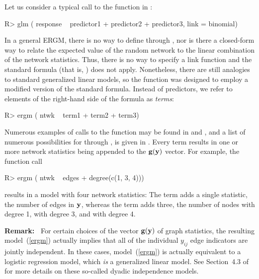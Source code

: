 \documentclass[nojss]{jss}
\def\vec#1{\mathchoice{\mbox{\boldmath$\displaystyle\bf#1$}}
{\mbox{\boldmath$\textstyle\bf#1$}}
{\mbox{\boldmath$\scriptstyle\bf#1$}}
{\mbox{\boldmath$\scriptscriptstyle\bf#1$}}}
\begin{document}
Let us consider a typical call to the  function in :
\begin{CodeChunk}
\begin{CodeInput}
R> glm ( response ~ predictor1 + predictor2 + predictor3, link = binomial)
\end{CodeInput}
\end{CodeChunk}
In a general ERGM, there
is no way to define  through ,
nor is there a closed-form way to relate the expected value of the random
network to the linear combination of the network statistics.  Thus, there is
no way to specify a link function and the standard  formula
(that is, ) does not apply.  Nonetheless, there
are still analogies to standard generalized linear models, so the
 function was designed to employ a modified version of the
standard  formula.  Instead of predictors, we refer to elements of
the right-hand side of the formula as {\em terms}:
\begin{CodeChunk}
\begin{CodeInput}
R> ergm ( ntwk ~ term1 + term2 + term3)
\end{CodeInput}
\end{CodeChunk}
Numerous examples of calls to the  function may be found in
\citet{ergmjss} and \citet{statnettutorialjss}, and a list of numerous possibilities
for  through , is given in \citet{ergmtermsjss}.
Every term results in one or more network statistics being appended to the 
$\vec g(\vec y)$ vector.  For example, the function call
\begin{CodeChunk}
\begin{CodeInput}
R> ergm ( ntwk ~ edges + degree(c(1, 3, 4)))
\end{CodeInput}
\end{CodeChunk}
results in a model with four network statistics:
The  term adds
a single statistic, the number of edges in $\vec y$, whereas the  term
adds three, the number of nodes with degree 1, with degree 3, and with degree 4.

{\bf Remark:\ }
For certain choices of the vector $\vec g(\vec y)$ of graph statistics, the resulting
model~(\ref{ergm}) actually implies that all of the individual $y_{ij}$ edge indicators
are jointly independent.  In these cases, model~(\ref{ergm}) is actually equivalent
to a logistic regression model, which {\em is} a generalized linear model.
See Section~4.3 of \cite{ergmjss} for more details on these so-called
dyadic independence models.
\end{document}
